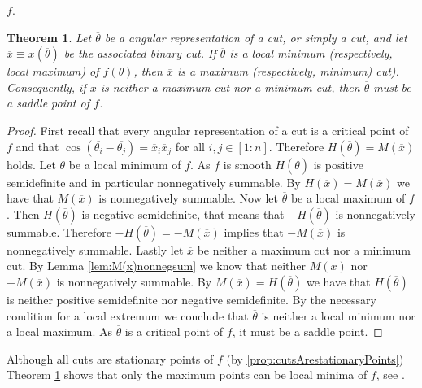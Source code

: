 \documentclass[12pt,a4paper]{article}
\theoremstyle{mythm}
\newtheorem{thm}{Theorem}[section]
\begin{document}
$ f $.
\begin{thm}
\label{thm:classificationcuts} 
Let $ \overline{ \theta }  $ be a angular representation of a cut, or simply a cut, and let $ \overline{ x } \equiv x( \overline{ \theta } ) $ be the associated binary cut. If $ \overline{ \theta }  $ is a local minimum
(respectively, local maximum) of $ f (\theta) $, then $ \overline{ x }  $ is a maximum (respectively, minimum) cut). 
Consequently, if $ \overline{ x }  $ is neither a maximum cut nor a minimum cut, then $ \overline{ \theta }  $ must be a saddle point of $ f $.
\end{thm} 
\begin{proof}
First recall that every angular representation of a cut is a critical point of $ f $ and that 
$ \cos( \overline{ \theta_i } - \overline{ \theta_j }  ) = \overline{ x }_i \overline{ x }_j  $ for all $ i,j \in \left[ 1:n \right]  $.
Therefore $ H( \overline{ \theta } ) = M( \overline{ x } ) $ holds.
Let $ \overline{ \theta }  $ be a local minimum of $ f $.
As $ f $ is smooth $ H ( \overline{ \theta } ) $ is positive semidefinite and in particular nonnegatively summable. By $ H ( \overline{ x } ) = M ( \overline{ x } ) $ we have
that $ M ( \overline{ x } ) $ is nonnegatively summable.
Now let $ \overline{ \theta }  $ be a local maximum of $ f $. Then $ H ( \overline{ \theta } ) $ is negative semidefinite, that means that $ - H ( \overline{ \theta } ) $ is
nonnegatively summable. Therefore $ - H ( \overline{ \theta } ) = - M ( \overline{ x } ) $ implies that $ - M ( \overline{ x } ) $ is nonnegatively summable.
Lastly let $ \overline{ x }  $ be neither a maximum cut nor a minimum cut.
By Lemma \ref{lem:M(x)nonnegsum} we know that neither $ M ( \overline{ x } ) $ nor $ - M ( \overline{ x } ) $ is nonnegatively summable. 
By $ M ( \overline{  x } ) = H ( \overline{ \theta } ) $ we have that $ H ( \overline{ \theta } )  $ is neither positive semidefinite nor negative semidefinite. By the
necessary condition for a local extremum we conclude that $ \overline{ \theta }  $ is neither a local minimum nor a local maximum. As $ \overline{ \theta }  $ is a critical
point of $ f $, it must be a saddle point.
\end{proof}
Although all cuts are stationary points of $ f $ (by \ref{prop:cutsArestationaryPoints}) Theorem \ref{thm:classificationcuts} shows that only the maximum points can be local minima of $ f $, see \cite[p. 508]{Burer2002}.
\end{document}
